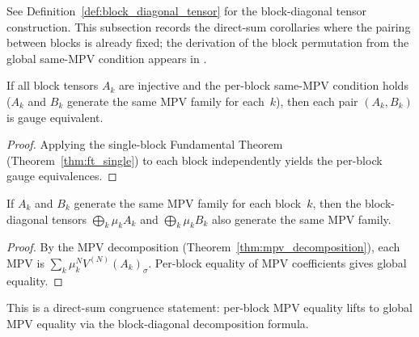 \begin{remark}
    See Definition~\ref{def:block_diagonal_tensor} for the block-diagonal tensor
    construction. This subsection records the direct-sum corollaries where the
    pairing between blocks is already fixed; the derivation of the block
    permutation from the global same-MPV condition appears in
    \cite[Theorem~2.10]{Cirac2016MPDO_arXiv}.
\end{remark}

\begin{lemma}\label{lem:multi_block_ft}
    \leanok
    If all block tensors $A_k$ are injective and the per-block
    same-MPV condition holds ($A_k$ and $B_k$ generate the same
    MPV family for each~$k$),
    then each pair $(A_k, B_k)$ is gauge equivalent.
\end{lemma}

\begin{proof}
    \leanok
    Applying the single-block Fundamental Theorem
    (Theorem~\ref{thm:ft_single}) to each block independently yields the
    per-block gauge equivalences.
\end{proof}

\begin{lemma}\label{lem:block_to_global_mpv}
    \leanok
    If $A_k$ and $B_k$ generate the same MPV family for each
    block~$k$, then the block-diagonal tensors
    $\bigoplus_k \mu_k A_k$ and $\bigoplus_k \mu_k B_k$
    also generate the same MPV family.
\end{lemma}

\begin{proof}\leanok{}
    By the MPV decomposition (Theorem~\ref{thm:mpv_decomposition}),
    each MPV is $\sum_k \mu_k^N V^{(N)}(A_k)_\sigma$.
    Per-block equality of MPV coefficients gives global equality.
\end{proof}

\begin{remark}
    This is a direct-sum congruence statement: per-block MPV equality lifts to
    global MPV equality via the block-diagonal decomposition formula.
\end{remark}

